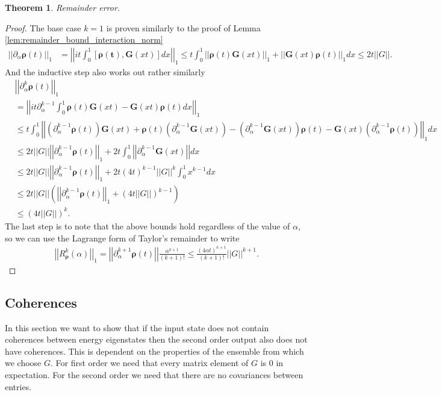 \documentclass[
 amsmath,amssymb,
 aps,
onecolumn, 
nofootinbib]{revtex4-2}
\newtheorem{theorem}{Theorem}
\newcommand{\norm}[1]{\left|\left| #1 \right|\right|}
\begin{document}
\begin{theorem}
    Remainder error.
\end{theorem}
\begin{proof}
The base case $k = 1$ is proven similarly to the proof of Lemma \ref{lem:remainder_bound_interaction_norm}
\begin{align}
    \norm{\partial_\alpha \boldsymbol{\rho}(t)}_1 &=  \norm{i t\int_0^1 [\boldsymbol{\rho(t)}, \boldsymbol{G}(x t)] dx }_1 \le t \int_0^1 \norm{\boldsymbol{\rho}(t) \boldsymbol{G}(xt)}_1 + \norm{\boldsymbol{G}(xt) \boldsymbol{\rho}(t)}_1 dx \le 2 t \norm{G}.
\end{align}
And the inductive step also works out rather similarly
\begin{align}
    &\norm{\partial_\alpha^{k} \boldsymbol{\rho}(t)}_1 \\
    &= \norm{i t \partial_{\alpha}^{k - 1} \int_0^1 \boldsymbol{\rho}(t) \boldsymbol{G}(xt) - \boldsymbol{G}(xt) \boldsymbol{\rho}(t) dx }_1 \\
    &\le t \int_0^1 \norm{(\partial_\alpha^{k - 1} \boldsymbol{\rho}(t) ) \boldsymbol{G}(xt) + \boldsymbol{\rho}(t) (\partial_\alpha^{k - 1} \boldsymbol{G}(xt)) - (\partial_\alpha^{k -1} \boldsymbol{G}(xt)) \boldsymbol{\rho}(t) - \boldsymbol{G}(xt) (\partial_\alpha^{k-  1} \boldsymbol{\rho}(t))}_1 dx \\
    &\le 2 t \norm{G} \norm{\partial_\alpha^{k - 1} \boldsymbol{\rho}(t)}_1 + 2 t \int_0^1 \norm{\partial_{\alpha}^{k - 1} \boldsymbol{G}(xt)} dx \\
    &\le 2 t \norm{G} \norm{\partial_\alpha^{k - 1} \boldsymbol{\rho}(t)}_1 + 2 t (4 t)^{k - 1} \norm{G}^k \int_0^1 x^{k - 1} d x \\
    &\le 2 t \norm{G} \left( \norm{\partial_\alpha^{k - 1} \boldsymbol{\rho}(t)}_1 + (4t \norm{G})^{k - 1} \right) \\
    &\le \left(4 t \norm{G} \right)^k.
\end{align}
The last step is to note that the above bounds hold regardless of the value of $\alpha$, so we can use the Lagrange form of Taylor's remainder to write
\begin{align}
    \norm{R_{\boldsymbol{\rho}}^k (\alpha)}_1 = \norm{\partial_\alpha^{k + 1} \boldsymbol{\rho}(t) } \frac{\alpha^{k + 1}}{(k + 1)!} \le \frac{(4 \alpha t)^{k + 1}}{(k + 1)!}  \norm{G}^{k + 1}.
\end{align}
\end{proof}

\subsection{Coherences}
In this section we want to show that if the input state does not contain coherences between energy eigenstates then the second order output also does not have coherences. This is dependent on the properties of the ensemble from which we choose $G$. For first order we need that every matrix element of $G$ is 0 in expectation. For the second order we need that there are no covariances between entries. 
\end{document}
